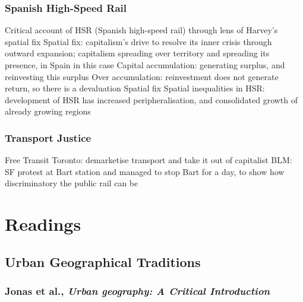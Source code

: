 \documentclass{article}
\begin{document}
\subsubsection{Spanish High-Speed Rail}

\begin{outline}
	\1 Critical account of HSR (Spanish high-speed rail) through lens of Harvey's spatial fix
	\1 Spatial fix: capitalism's drive to resolve its inner crisis through outward expansion; capitalism spreading over territory and spreading its presence, in Spain in this case
		\2 Capital accumulation: generating surplus, and reinvesting this surplus
		\2 Over accumulation: reinvestment does not generate return, so there is a devaluation
		\2 Spatial fix
	\1 Spatial inequalities in HSR: development of HSR has increased peripheralisation, and consolidated growth of already growing regions
\end{outline}

\subsubsection{Transport Justice}

\begin{outline}
	\1 Free Transit Toronto: demarketise transport and take it out of capitalist 
	\1 BLM: SF protest at Bart station and managed to stop Bart for a day, to show how discriminatory the public rail can be
\end{outline}




\section{Readings}

\subsection{Urban Geographical Traditions}

\subsubsection{Jonas et al., \textit{Urban geography: A Critical Introduction}}

\begin{outline}
	\1
\end{outline}
\end{document}
